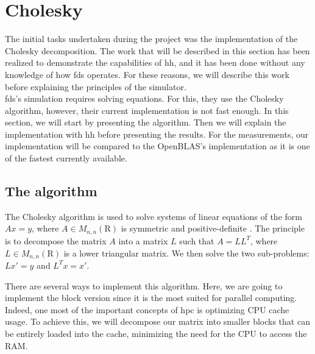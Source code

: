 
\clearpage{}
\section{Cholesky}
\label{sec:cholesky}

The initial tasks undertaken during the project was the implementation of the
Cholesky decomposition. The work that will be described in this section has been
realized to demonstrate the capabilities of \gls{hh}, and it has been done
without any knowledge of how \gls{fds} operates. For these reasons, we will
describe this work before explaining the principles of the simulator.\\

\gls{fds}'s simulation requires solving equations. For this, they use the
Cholesky algorithm, however, their current implementation is not fast enough. In
this section, we will start by presenting the algorithm. Then we will explain
the implementation with \gls{hh} before presenting the results. For the
measurements, our implementation will be compared to the OpenBLAS's
implementation as it is one of the fastest currently available.

\subsection{The algorithm}
\label{sec:choalgo}

The Cholesky algorithm is used to solve systems of linear equations of the form
$Ax = y$, where $A \in M_{n,n}(\mathrm{R})$ is symmetric and positive-definite
\cite{choleskywiki}. The principle is to decompose the matrix $A$ into a matrix
$L$ such that $A = LL^{T}$, where $L \in M_{n,n}(\mathrm{R})$ is a lower
triangular matrix. We then solve the two sub-problems: $Lx' = y$ and $L^{T}x =
x'$.

There are several ways to implement this algorithm. Here, we are going to
implement the block version since it is the most suited for parallel computing.
Indeed, one most of the important concepts of \gls{hpc} is optimizing CPU cache
usage. To achieve this, we will decompose our matrix into smaller blocks that
can be entirely loaded into the cache, minimizing the need for the CPU to access
the RAM.

